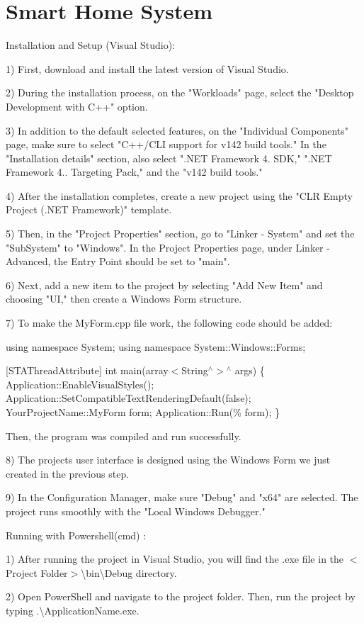 \chapter{Smart Home System}
\hypertarget{index}{}\label{index}
\label{index_md_ana__sayfa}%
%


Installation and Setup (Visual Studio)\+:

1) First, download and install the latest version of Visual Studio.

2) During the installation process, on the "{}\+Workloads"{} page, select the "{}\+Desktop Development with C++"{} option.

3) In addition to the default selected features, on the "{}\+Individual Components"{} page, make sure to select "{}\+C++/\+CLI support for v142 build tools."{} In the "{}\+Installation details"{} section, also select "{}.\+NET Framework 4. SDK,"{} "{}.\+NET Framework 4.. Targeting Pack,"{} and the "{}v142 build tools."{}

4) After the installation completes, create a new project using the "{}\+CLR Empty Project (.\+NET Framework)"{} template.

5) Then, in the "{}\+Project Properties"{} section, go to "{}\+Linker -\/ System"{} and set the "{}\+Sub\+System"{} to "{}\+Windows"{}. In the Project Properties page, under Linker -\/ Advanced, the Entry Point should be set to "{}main"{}.

6) Next, add a new item to the project by selecting "{}\+Add New Item"{} and choosing "{}\+UI,"{} then create a Windows Form structure.

7) To make the My\+Form.\+cpp file work, the following code should be added\+:

using namespace System; using namespace System\+::\+Windows\+::\+Forms;

\mbox{[}STAThread\+Attribute\mbox{]} int main(array$<$\+String\texorpdfstring{$^\wedge$}{\string^}$>$\texorpdfstring{$^\wedge$}{\string^} args) \{ Application\+::\+Enable\+Visual\+Styles(); Application\+::\+Set\+Compatible\+Text\+Rendering\+Default(false); Your\+Project\+Name\+::\+My\+Form form; Application\+::\+Run(\% form); \}

Then, the program was compiled and run successfully.

8) The project\textquotesingle{}s user interface is designed using the Windows Form we just created in the previous step.

9) In the Configuration Manager, make sure "{}\+Debug"{} and "{}x64"{} are selected. The project runs smoothly with the "{}\+Local Windows Debugger."{}



Running with Powershell(cmd) \+:

1) After running the project in Visual Studio, you will find the .exe file in the $<$\+Project Folder$>$\textbackslash{}bin\textbackslash{}\+Debug directory.

2) Open Power\+Shell and navigate to the project folder. Then, run the project by typing .\textbackslash{}\+Application\+Name.exe. 